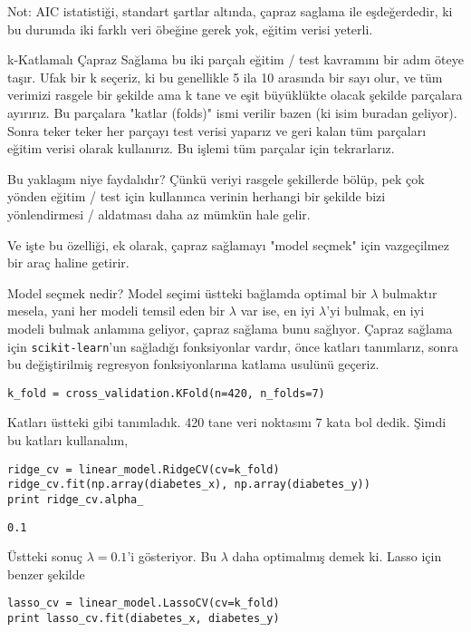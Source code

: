 \documentclass[12pt,fleqn]{article}\usepackage{../../common}
\begin{document}
Not: AIC istatistiği, standart şartlar altında, çapraz saglama ile
eşdeğerdedir, ki bu durumda iki farklı veri öbeğine gerek yok, eğitim
verisi yeterli.

k-Katlamalı Çapraz Sağlama bu iki parçalı eğitim / test kavramını bir adım
öteye taşır. Ufak bir k seçeriz, ki bu genellikle 5 ila 10 arasında bir
sayı olur, ve tüm verimizi rasgele bir şekilde ama k tane ve eşit
büyüklükte olacak şekilde parçalara ayırırız. Bu parçalara "katlar (folds)"
ismi verilir bazen (ki isim buradan geliyor). Sonra teker teker her parçayı
test verisi yaparız ve geri kalan tüm parçaları eğitim verisi olarak
kullanırız. Bu işlemi tüm parçalar için tekrarlarız.

Bu yaklaşım niye faydalıdır? Çünkü veriyi rasgele şekillerde bölüp, pek çok
yönden eğitim / test için kullanınca verinin herhangi bir şekilde bizi
yönlendirmesi / aldatması daha az mümkün hale gelir.

Ve işte bu özelliği, ek olarak, çapraz sağlamayı "model seçmek" için
vazgeçilmez bir araç haline getirir.

Model seçmek nedir? Model seçimi üstteki bağlamda optimal bir $\lambda$
bulmaktır mesela, yani her modeli temsil eden bir $\lambda$ var ise, en iyi
$\lambda$'yi bulmak, en iyi modeli bulmak anlamına geliyor, çapraz sağlama
bunu sağlıyor. Çapraz sağlama için \verb!scikit-learn!'un sağladığı
fonksiyonlar vardır, önce katları tanımlarız, sonra bu değiştirilmiş
regresyon fonksiyonlarına katlama usulünü geçeriz.

\begin{verbatim}
k_fold = cross_validation.KFold(n=420, n_folds=7)
\end{verbatim}

Katları üstteki gibi tanımladık. 420 tane veri noktasını 7 kata bol dedik.
Şimdi bu katları kullanalım,

\begin{verbatim}
ridge_cv = linear_model.RidgeCV(cv=k_fold)
ridge_cv.fit(np.array(diabetes_x), np.array(diabetes_y))
print ridge_cv.alpha_
\end{verbatim}

\begin{verbatim}
0.1
\end{verbatim} 

Üstteki sonuç $\lambda = 0.1$'i gösteriyor. Bu $\lambda$ daha optimalmış
demek ki. Lasso için benzer şekilde

\begin{verbatim}
lasso_cv = linear_model.LassoCV(cv=k_fold)
print lasso_cv.fit(diabetes_x, diabetes_y)
\end{verbatim}
\end{document}

